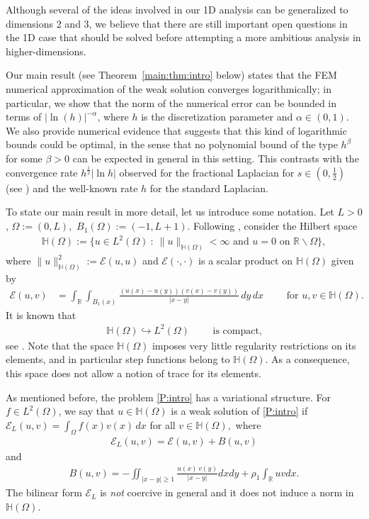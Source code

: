 \documentclass[11 pt]{article}
\numberwithin{equation}{section}
\def\R{\mathbb{R}}
\def\mH{\mathbb{H}}
\def\cE{\mathcal{E}}
\begin{document}
Although several of the ideas involved in our 1D analysis can be generalized to dimensions 2 and 3, we believe that there are still important open questions in the 1D case that should be solved before attempting a more ambitious analysis in higher-dimensions.

Our main result (see Theorem~\ref{main:thm:intro} below) states that the FEM numerical approximation of the weak solution converges logarithmically; in particular, we show that the norm of the numerical error can be bounded in terms of $|\ln(h)|^{-\alpha}$, where $h$ is the discretization parameter and $\alpha\in(0,1)$. We also provide numerical evidence that suggests that this kind of logarithmic bounds could be optimal, in the sense that no polynomial bound of the type $h^\beta$ for some $\beta>0$ can be expected in general in this setting.  This contrasts with the convergence rate $h^\frac{1}{2}|\ln h|$ observed for the fractional Laplacian for $s\in(0,\frac{1}{2})$ (see \cite[Theorem 3.31]{Bor17}) and the well-known rate $h$ for the standard Laplacian.

To state our main result in more detail, let us introduce some notation. Let $L>0$, $\Omega:=(0,L),$ $B_1(\Omega):=(-1,L+1)$. Following \cite{CW19}, consider the Hilbert space
\begin{align*}
\mH(\Omega):=\{u\in L^2(\Omega)\::\: \|u\|_{\mathbb H(\Omega)}<\infty \text{ and }u=0\text{ on }\R\backslash \Omega\},
\end{align*}
where $\|u\|^2_{\mathbb H(\Omega)}:={\mathcal E}(u,u)$ and ${\mathcal E}(\cdot,\cdot)$ is a scalar product on $\mathbb H(\Omega)$ given by
\begin{align*}
    {\mathcal E}(u,v)&=\int_{\R}\int_{B_1(x)}\frac{(u(x)-u(y))(v(x)-v(y))}{|x-y|}\, dy\, dx \qquad \text{ for }u,v\in \mH(\Omega).
\end{align*}
It is known that
\begin{align}\label{c:em}
\mathbb H(\Omega)\hookrightarrow L^2(\Omega)\qquad \text{ is compact,}
\end{align}
see \cite[Theorem 2.1]{CdP18}. Note that the space $\mH(\Omega)$ imposes very little regularity restrictions on its elements, and in particular step functions belong to $\mH(\Omega)$. As a consequence, this space does not allow a notion of trace for its elements.

As mentioned before, the problem \eqref{P:intro} has a variational structure. For $f\in L^2(\Omega)$, we say that $u\in \mH(\Omega)$ is a weak solution of \eqref{P:intro} if $    \cE_{L}(u,v)=\int_{\Omega} f(x) v(x)\, dx$ for all $v\in  \mH(\Omega),$ where
\begin{align}\label{cEL:def}
\cE_L(u,v)=\cE(u,v)+B(u,v) 
\end{align}
and
\begin{align}\label{eq:bilinear_B}
    B(u,v)=-\iint_{|x-y|\geq 1}\frac{u(x)\,v(y)}{|x-y|}dx dy+\rho_1\int_{\R}u v dx.
\end{align}
 The bilinear form $\cE_L$ is \emph{not} coercive in general and it does not induce a norm in $\mH(\Omega)$.
\end{document}

